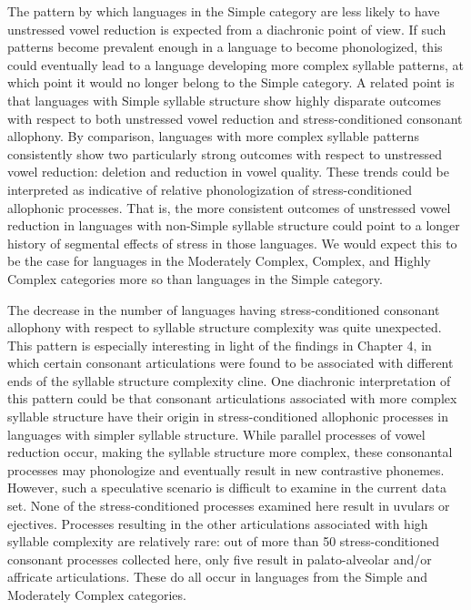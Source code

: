   The pattern by which languages in the Simple category are less likely to have unstressed vowel reduction is expected from a diachronic point of view. If such patterns become prevalent enough in a language to become phonologized, this could eventually lead to a language developing more complex syllable patterns, at which point it would no longer belong to the Simple category. A related point is that languages with Simple syllable structure show highly disparate outcomes with respect to both unstressed vowel reduction and stress-conditioned consonant allophony. By comparison, languages with more complex syllable patterns consistently show two particularly strong outcomes with respect to unstressed vowel reduction: deletion and reduction in vowel quality. These trends could be interpreted as indicative of relative phonologization of stress-conditioned allophonic processes. That is, the more consistent outcomes of unstressed vowel reduction in languages with non-Simple syllable structure could point to a longer history of segmental effects of stress in those languages. We would expect this to be the case for languages in the Moderately Complex, Complex, and Highly Complex categories more so than languages in the Simple category. 



  The decrease in the number of languages having stress-conditioned consonant allophony with respect to syllable structure complexity was quite unexpected. This pattern is especially interesting in light of the findings in Chapter 4, in which certain consonant articulations were found to be associated with different ends of the syllable structure complexity cline. One diachronic interpretation of this pattern could be that consonant articulations associated with more complex syllable structure have their origin in stress-conditioned allophonic processes in languages with simpler syllable structure. While parallel processes of vowel reduction occur, making the syllable structure more complex, these consonantal processes may phonologize and eventually result in new contrastive phonemes. However, such a speculative scenario is difficult to examine in the current data set. None of the stress-conditioned processes examined here result in uvulars or ejectives. Processes resulting in the other articulations associated with high syllable complexity are relatively rare: out of more than 50 stress-conditioned consonant processes collected here, only five result in palato-alveolar and/or affricate articulations. These do all occur in languages from the Simple and Moderately Complex categories.



